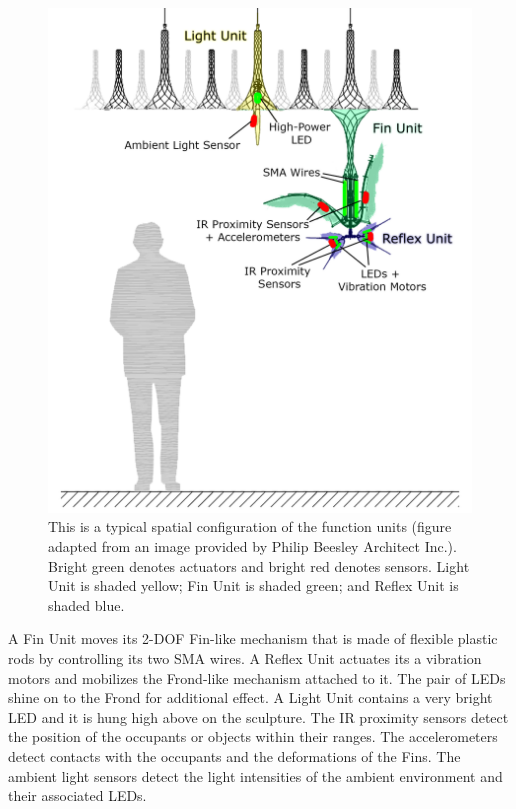 \begin{figure}[!htbp]
	\centering
	\includegraphics[height=0.85 \textheight]{"fig/interactive control system/Physical hardware"}
	\caption[Typical spatial configuration of the physical functional units]{This is a typical spatial configuration of the function units (figure adapted from an image provided by Philip Beesley Architect Inc.). Bright green denotes actuators and bright red denotes sensors. Light Unit is shaded yellow; Fin Unit is shaded green; and Reflex Unit is shaded blue.}
	\label{fig:Physical hardware}
\end{figure}

A Fin Unit moves its 2-DOF Fin-like mechanism that is made of flexible plastic rods by controlling its two SMA wires. A Reflex Unit actuates its a vibration motors and mobilizes the Frond-like mechanism attached to it. The pair of LEDs shine on to the Frond for additional effect. A Light Unit contains a very bright LED and it is hung high above on the sculpture. The IR proximity sensors detect the position of the occupants or objects within their ranges. The accelerometers detect contacts with the occupants and the deformations of the Fins. The ambient light sensors detect the light intensities of the ambient environment and their associated LEDs. 


